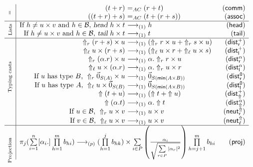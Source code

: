 \documentclass[preprint]{elsarticle}
\newcommand\titulo[3][\scriptsize]{\rotatebox[origin=c]{90}{\parbox[t]{#2}{\centering #1{#3}}}}
\newcommand\lra[1][1]{\longrightarrow_{\left(#1\right)}}
\newcommand\lrap{\lra[p]}
\newcommand\pair[2]{({#1}+{#2})}
\newcommand\basis{\ensuremath{\mathcal B}}
\newcommand\s[1]{\ensuremath{\mathsf{#1}}}
\newcommand\head{\text{\sl head}}
\newcommand\tail{\text{\sl tail}}
\newcommand\z[1][A]{\vec 0_{S(#1)}}
\newcommand\may[1][\alpha]{[{#1}.]}
\newcommand\rdistcasum{(\s{dist^+_\Uparrow})}
\newcommand\rdistcascal{(\s{dist^\alpha_\Uparrow})}
\newcommand\rcaneutl{(\s{neut^\Uparrow_\ell})}
\newcommand\rcaneutr{(\s{neut^\Uparrow_r})}
\newcommand\rproj{(\s{proj})}
\newcommand\rhead{(\s{head})}
\newcommand\rtail{(\s{tail})}
\newcommand\rdistzr{(\s{dist^0_r})}
\newcommand\rdistzl{(\s{dist^0_l})}
\newcommand\rdistscalr{(\s{dist^\alpha_r})}
\newcommand\rdistscall{(\s{dist^\alpha_l})}
\newcommand\rdistsumr{(\s{dist^+_r})}
\newcommand\rdistsuml{(\s{dist^+_l})}
\newcommand\rcomm{(\s{comm})}
\newcommand\rassoc{(\s{assoc})}
\begin{document}
\begin{table}
{{\[\begin{array}{c|r@{\ }lr}
          \multirow{2}{*}{\titulo{8.4mm}{=}}
          &\pair tr &=_{AC}\pair rt & \rcomm\\
          &\pair{\pair tr}s &=_{AC} \pair t{\pair rs} & \rassoc\\\hline
          \multirow{2}{*}{\titulo{8.4mm}{Lists}}
          &\textrm{If $h\neq u\times v$ and $h\in\basis$, }\head\ h\times t &\lra h
                                                                                                  & \rhead\\
          &\textrm{If $h\neq u\times v$ and $h\in\basis$, }\tail\ h\times t
                                                                                     &\lra t & \rtail\\\hline
          \multirow{10}{*}{\titulo{52mm}{\mbox{\hspace{1.3cm}Typing casts}}}
          & \Uparrow_r \pair rs\times u &\lra\pair{\Uparrow_r r\times u}{\Uparrow_r s\times u} &\rdistsumr\\
          &\Uparrow_\ell u\times\pair rs &\lra\pair{\Uparrow_\ell u\times r}{\Uparrow_\ell u\times s} &\rdistsuml\\
          &\Uparrow_r (\alpha.r)\times u &\lra \alpha.\Uparrow_r r\times u &\rdistscalr\\
          &\Uparrow_\ell u\times(\alpha.r) &\lra \alpha.\Uparrow_r u\times r &\rdistscall\\
          &\textrm{If $u$ has type $B$, }\Uparrow_r \z\times u &\lra\z[\mathsf{min}(A\times B)] &\rdistzr\\
          &\textrm{If $u$ has type $A$, }\Uparrow_\ell u\times\z[B] &\lra\z[\mathsf{min}(A\times B)] &\rdistzl\\
          &\Uparrow\pair tu&\lra\pair{\Uparrow t}{\Uparrow u} &\rdistcasum\\
          &\Uparrow(\alpha.t)&\lra\alpha.\Uparrow t &\rdistcascal\\
          &\textrm{If $u\in\basis$, }\Uparrow_r u\times v&\lra u\times v &\rcaneutr\\
          &\textrm{If $v\in\basis$, }\Uparrow_\ell u\times v&\lra u\times v &\rcaneutl \\\hline
          \multirow{2}{*}{\titulo{12.5mm}{Projection}}
          &\multicolumn{2}{c}{
            \pi_j(\sum\limits_{i=1}^n
            \may[\alpha_i]\prod\limits_{h=1}^mb_{hi})\lrap
            (\prod\limits_{h=1}^jb_{hk})\times\sum\limits_{i\in P}\left(\frac{\alpha_i}{\sqrt{\sum\limits_{r\in P}|\alpha_r|^2}}\right)\prod\limits_{h=j+1}^mb_{hi}} & \rproj\\

\end{array}\]}}
\end{table}
\end{document}
